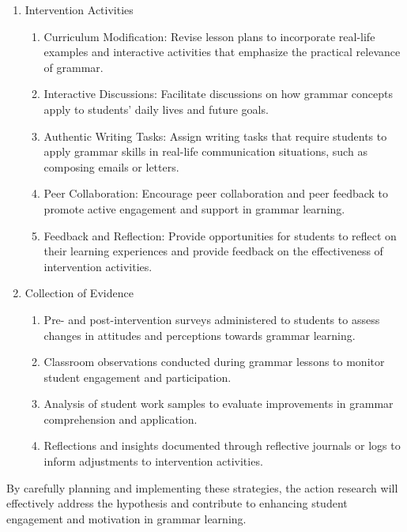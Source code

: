 \documentclass[12pt, a4paaper]{article}
\begin{document}
\begin{enumerate}
\begin{enumerate}
    \item Intervention Activities
    \begin{enumerate}
\item Curriculum Modification: Revise lesson plans to incorporate real-life examples and interactive activities that emphasize the practical relevance of grammar.
\item Interactive Discussions: Facilitate discussions on how grammar concepts apply to students' daily lives and future goals.
\item Authentic Writing Tasks: Assign writing tasks that require students to apply grammar skills in real-life communication situations, such as composing emails or letters.
\item Peer Collaboration: Encourage peer collaboration and peer feedback to promote active engagement and support in grammar learning.
\item Feedback and Reflection: Provide opportunities for students to reflect on their learning experiences and provide feedback on the effectiveness of intervention activities.
\end{enumerate}

    \item Collection of Evidence
    \begin{enumerate}
\item Pre- and post-intervention surveys administered to students to assess changes in attitudes and perceptions towards grammar learning.
\item Classroom observations conducted during grammar lessons to monitor student engagement and participation.
\item Analysis of student work samples to evaluate improvements in grammar comprehension and application.
\item Reflections and insights documented through reflective journals or logs to inform adjustments to intervention activities.
\end{enumerate}
\end{enumerate}

By carefully planning and implementing these strategies, the action research will effectively address the hypothesis and contribute to enhancing student engagement and motivation in grammar learning.
\end{enumerate}
\end{document}
